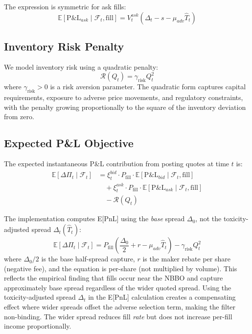 \documentclass[11pt]{article}
\theoremstyle{definition}
\begin{document}
The expression is symmetric for ask fills:
\begin{equation}
\mathbb{E}[\text{P\&L}_{ask} \mid \mathcal{F}_t, \text{fill}] = V_t^{ask} \left(\Delta_t - s - \mu_{adv} \hat{T}_t\right)
\end{equation}

\subsection{Inventory Risk Penalty}

We model inventory risk using a quadratic penalty:
\begin{equation}
\mathcal{R}(Q_t) = \gamma_{\text{risk}} Q_t^2
\end{equation}
where $\gamma_{\text{risk}} > 0$ is a risk aversion parameter. The quadratic form captures capital requirements, exposure to adverse price movements, and regulatory constraints, with the penalty growing proportionally to the square of the inventory deviation from zero.

\subsection{Expected P\&L Objective}

The expected instantaneous P\&L contribution from posting quotes at time $t$ is:
\begin{align}
\mathbb{E}[\Delta \Pi_t \mid \mathcal{F}_t] &= \xi_t^{bid} \cdot P_{\text{fill}} \cdot \mathbb{E}[\text{P\&L}_{bid} \mid \mathcal{F}_t, \text{fill}] \\
&\quad + \xi_t^{ask} \cdot P_{\text{fill}} \cdot \mathbb{E}[\text{P\&L}_{ask} \mid \mathcal{F}_t, \text{fill}] \\
&\quad - \mathcal{R}(Q_t)
\end{align}

The implementation computes E[PnL] using the \emph{base} spread $\Delta_0$, not the toxicity-adjusted spread $\Delta_t(\hat{T}_t)$:
\begin{equation}
\mathbb{E}[\Delta \Pi_t \mid \mathcal{F}_t] = P_{\text{fill}} \left(\frac{\Delta_0}{2} + r - \mu_{adv} \hat{T}_t\right) - \gamma_{\text{risk}} Q_t^2
\label{eq:expected_pnl}
\end{equation}
where $\Delta_0/2$ is the base half-spread capture, $r$ is the maker rebate per share (negative fee), and the equation is per-share (not multiplied by volume). This reflects the empirical finding that fills occur near the NBBO and capture approximately base spread regardless of the wider quoted spread. Using the toxicity-adjusted spread $\Delta_t$ in the E[PnL] calculation creates a compensating effect where wider spreads offset the adverse selection term, making the filter non-binding. The wider spread reduces fill \emph{rate} but does not increase per-fill income proportionally.
\end{document}
